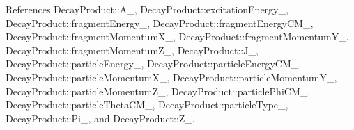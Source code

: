 References Decay\-Product\-::\-A\-\_\-, Decay\-Product\-::excitation\-Energy\-\_\-, Decay\-Product\-::fragment\-Energy\-\_\-, Decay\-Product\-::fragment\-Energy\-C\-M\-\_\-, Decay\-Product\-::fragment\-Momentum\-X\-\_\-, Decay\-Product\-::fragment\-Momentum\-Y\-\_\-, Decay\-Product\-::fragment\-Momentum\-Z\-\_\-, Decay\-Product\-::\-J\-\_\-, Decay\-Product\-::particle\-Energy\-\_\-, Decay\-Product\-::particle\-Energy\-C\-M\-\_\-, Decay\-Product\-::particle\-Momentum\-X\-\_\-, Decay\-Product\-::particle\-Momentum\-Y\-\_\-, Decay\-Product\-::particle\-Momentum\-Z\-\_\-, Decay\-Product\-::particle\-Phi\-C\-M\-\_\-, Decay\-Product\-::particle\-Theta\-C\-M\-\_\-, Decay\-Product\-::particle\-Type\-\_\-, Decay\-Product\-::\-Pi\-\_\-, and Decay\-Product\-::\-Z\-\_\-.

